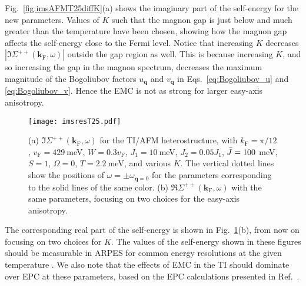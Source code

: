 \documentclass[aps, prb, twocolumn,amsmath,amssymb,floatfix]{revtex4-2}
\begin{document}
Fig.~\ref{fig:imsAFMT25diffK}(a) shows the imaginary part of the self-energy for the new parameters. Values of $K$ such that the magnon gap is just below and much greater than the temperature have been chosen, showing how the magnon gap affects the self-energy close to the Fermi level. Notice that increasing $K$ decreases $|\Im\Sigma^{++}(\boldsymbol{k}_{\textrm{F}}, \omega)|$ outside the gap region as well. This is because increasing $K$, and so increasing the gap in the magnon spectrum, decreases the maximum magnitude of the Bogoliubov factors $u_{\boldsymbol{q}}$ and $v_{\boldsymbol{q}}$ in Eqs.~\eqref{eq:Bogoliubov_u} and \eqref{eq:Bogoliubov_v}. Hence the EMC is not as strong for larger easy-axis anisotropy.   


\begin{figure}
    \centering
    \texttt{[image: imsresT25.pdf]}
    \caption{(a) $\Im\Sigma^{++}(\boldsymbol{k}_{\textrm{F}}, \omega)$ for the TI/AFM heterostructure, with $k_{\textrm{F}} = \pi/12$, $v_{\textrm{F}} = 429~$meV, $W=0.3v_{\textrm{F}}$, $J_1 = 10~$meV,  $J_2 = 0.05 J_1$, $\Bar{J} = 100~$meV, $S=1$, $\Omega = 0$, $T=2.2~$meV, and various $K$. The vertical dotted lines show the positions of $\omega = \pm\omega_{\boldsymbol{q}=0}$ for the parameters corresponding to the solid lines of the same color. (b) $\Re\Sigma^{++}(\boldsymbol{k}_{\textrm{F}}, \omega)$ with the same parameters, focusing on two choices for the easy-axis anisotropy. \label{fig:imsAFMT25diffK} \label{fig:resAFMT25} }
\end{figure}


The corresponding real part of the self-energy is shown in Fig.~\ref{fig:resAFMT25}(b), from now on focusing on two choices for $K$. 
The values of the self-energy shown in these figures should be measurable in ARPES for common energy resolutions at the given temperature \cite{Claessen2004, Claessen2009, Borisenko2012one, Rosenzweig2020overdoping, Iwasawa2020high, Tamai2013spin, Rosenzweig2019tuning}. We also note that the effects of EMC in the TI should dominate over EPC at these parameters, based on the EPC calculations presented in Ref.~\cite{GiraudEgger}. 

\end{document}
